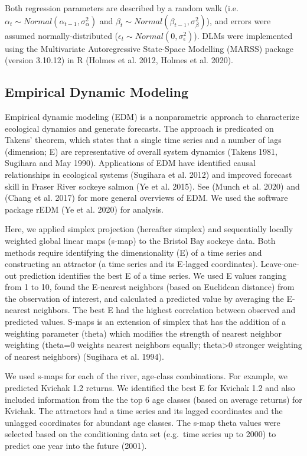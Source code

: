 \documentclass[
]{article}
\begin{document}
Both regression parameters are described by a random walk (i.e.~\(\alpha_t \sim Normal(\alpha_{t-1},\sigma^2_{\alpha})\) and \(\beta_t \sim Normal(\beta_{t-1},\sigma^2_{\beta})\)), and errors were assumed normally-distributed (\(\epsilon_t \sim Normal(0,\sigma^2_{\epsilon})\)). DLMs were implemented using the Multivariate Autoregressive State-Space Modelling (MARSS) package (version 3.10.12) in R (Holmes et al. 2012, Holmes et al. 2020).

\hypertarget{empirical-dynamic-modeling}{%
\subsection*{Empirical Dynamic Modeling}\label{empirical-dynamic-modeling}}

Empirical dynamic modeling (EDM) is a nonparametric approach to characterize ecological dynamics and generate forecasts. The approach is predicated on Takens' theorem, which states that a single time series and a number of lags (dimension; E) are representative of overall system dynamics (Takens 1981, Sugihara and May 1990). Applications of EDM have identified causal relationships in ecological systems (Sugihara et al. 2012) and improved forecast skill in Fraser River sockeye salmon (Ye et al. 2015). See (Munch et al. 2020) and (Chang et al. 2017) for more general overviews of EDM. We used the software package rEDM (Ye et al. 2020) for analysis.

Here, we applied simplex projection (hereafter simplex) and sequentially locally weighted global linear maps (s-map) to the Bristol Bay sockeye data. Both methods require identifying the dimensionality (E) of a time series and constructing an attractor (a time series and its E-lagged coordinates). Leave-one-out prediction identifies the best E of a time series. We used E values ranging from 1 to 10, found the E-nearest neighbors (based on Euclidean distance) from the observation of interest, and calculated a predicted value by averaging the E-nearest neighbors. The best E had the highest correlation between observed and predicted values. S-maps is an extension of simplex that has the addition of a weighting parameter (theta) which modifies the strength of nearest neighbor weighting (theta=0 weights nearest neighbors equally; theta\textgreater0 stronger weighting of nearest neighbors) (Sugihara et al. 1994).

We used s-maps for each of the river, age-class combinations. For example, we predicted Kvichak 1.2 returns. We identified the best E for Kvichak 1.2 and also included information from the the top 6 age classes (based on average returns) for Kvichak. The attractors had a time series and its lagged coordinates and the unlagged coordinates for abundant age classes. The s-map theta values were selected based on the conditioning data set (e.g.~time series up to 2000) to predict one year into the future (2001).
\end{document}
